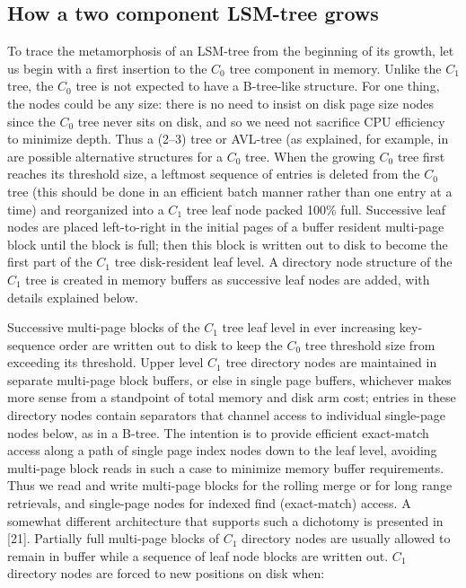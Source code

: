 \documentclass[a4paper,12pt,notitlepage,twoside,openright]{article}
\begin{document}
\hypertarget{how-a-two-component-lsm-tree-grows}{%
\subsection{How a two component LSM-tree
grows}\label{how-a-two-component-lsm-tree-grows}}


To trace the metamorphosis of an LSM-tree from the beginning of its
growth, let us begin with a first insertion to the \(C_0\) tree component in
memory. Unlike the \(C_1\) tree, the \(C_0\) tree is not expected to have a
B-tree-like structure. For one thing, the nodes could be any size: there
is no need to insist on disk page size nodes since the \(C_0\) tree never
sits on disk, and so we need not sacrifice CPU efficiency to minimize
depth. Thus a (2--3) tree or AVL-tree (as explained, for example, in
are possible alternative structures for a \(C_0\) tree. When the growing \(C_0\)
tree first reaches its threshold size, a leftmost sequence of entries is
deleted from the \(C_0\) tree (this should be done in an efficient batch manner
rather than one entry at a time) and reorganized into a \(C_1\) tree leaf
node packed 100\% full. Successive leaf nodes are placed left-to-right
in the initial pages of a buffer resident multi-page block until the
block is full; then this block is written out to disk to become the
first part of the \(C_1\) tree disk-resident leaf level. A directory node
structure of the \(C_1\) tree is created in memory buffers as successive leaf
nodes are added, with details explained below.

Successive multi-page blocks of the \(C_1\) tree leaf level in ever
increasing key-sequence order are written out to disk to keep the \(C_0\) tree
threshold size from exceeding its threshold. Upper level \(C_1\) tree
directory nodes are maintained in separate multi-page block buffers, or
else in single page buffers, whichever makes more sense from a
standpoint of total memory and disk arm cost; entries in these directory
nodes contain separators that channel access to individual single-page
nodes below, as in a B-tree. The intention is to provide efficient
exact-match access along a path of single page index nodes down to the
leaf level, avoiding multi-page block reads in such a case to minimize
memory buffer requirements. Thus we read and write multi-page blocks for
the rolling merge or for long range retrievals, and single-page nodes
for indexed find (exact-match) access. A somewhat different architecture
that supports such a dichotomy is presented in {[}21{]}. Partially full
multi-page blocks of \(C_1\) directory nodes are usually allowed to remain in
buffer while a sequence of leaf node blocks are written out. \(C_1\)
directory nodes are forced to new positions on disk when:
\end{document}

